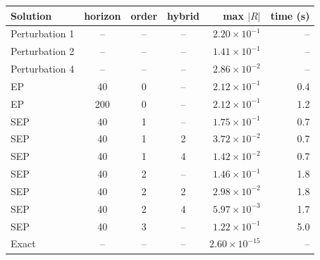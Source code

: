 \begin{tabular}{lcccrr}
\toprule
Solution & horizon & order & hybrid & max $|R|$ & time (s) \\
\midrule
Perturbation 1 & -- & -- & -- & $2.20\times10^{-1}$ & -- \\
Perturbation 2 & -- & -- & -- & $1.41\times10^{-1}$ & -- \\
Perturbation 4 & -- & -- & -- & $2.86\times10^{-2}$ & -- \\
EP & 40 & 0 & -- & $2.12\times10^{-1}$ & 0.4 \\
EP & 200 & 0 & -- & $2.12\times10^{-1}$ & 1.2 \\
SEP & 40 & 1 & -- & $1.75\times10^{-1}$ & 0.7 \\
SEP & 40 & 1 & 2 & $3.72\times10^{-2}$ & 0.7 \\
SEP & 40 & 1 & 4 & $1.42\times10^{-2}$ & 0.7 \\
SEP & 40 & 2 & -- & $1.46\times10^{-1}$ & 1.8 \\
SEP & 40 & 2 & 2 & $2.98\times10^{-2}$ & 1.8 \\
SEP & 40 & 2 & 4 & $5.97\times10^{-3}$ & 1.7 \\
SEP & 40 & 3 & -- & $1.22\times10^{-1}$ & 5.0 \\
Exact & -- & -- & -- & $2.60\times10^{-15}$ & -- \\
\bottomrule
\end{tabular}
